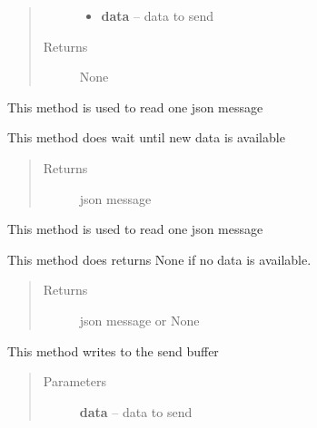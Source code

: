 \documentclass[letterpaper,10pt,english]{sphinxmanual}
\begin{document}
\begin{fulllineitems}
\begin{fulllineitems}
\begin{quote}
\begin{description}
\begin{itemize}
\item {} 
\textbf{data} -- data to send

\end{itemize}

\item[{Returns}] \leavevmode
None

\end{description}\end{quote}

\end{fulllineitems}


\begin{fulllineitems}
\label{libraries:libraries.ethernet._TcpConnection.read_block}
This method is used to read one json message

This method does wait until new data is available
\begin{quote}\begin{description}
\item[{Returns}] \leavevmode
json message

\end{description}\end{quote}

\end{fulllineitems}


\begin{fulllineitems}
\label{libraries:libraries.ethernet._TcpConnection.read_no_block}
This method is used to read one json message

This method does returns None if no data is available.
\begin{quote}\begin{description}
\item[{Returns}] \leavevmode
json message or None

\end{description}\end{quote}

\end{fulllineitems}


\begin{fulllineitems}
\label{libraries:libraries.ethernet._TcpConnection.write}
This method writes to the send buffer
\begin{quote}\begin{description}
\item[{Parameters}] \leavevmode
\textbf{data} -- data to send


\end{description}
\end{quote}
\end{fulllineitems}
\end{fulllineitems}
\end{document}
